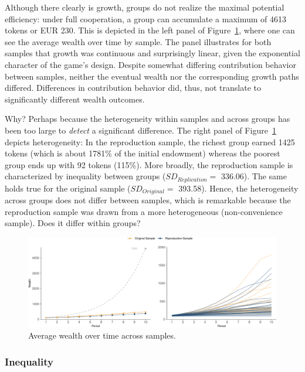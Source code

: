 \documentclass[
  authoryear,
  review,
  3p,
  onecolumn]{elsarticle}
\begin{document}
Although there clearly is growth, groups do not realize the maximal
potential efficiency: under full cooperation, a group can accumulate a
maximum of 4613 tokens or EUR 230. This is depicted in the left panel of
Figure~\ref{fig-growth-heterogeneity}, where one can see the average
wealth over time by sample. The panel illustrates for both samples that
growth was continuous and surprisingly linear, given the exponential
character of the game's design. Despite somewhat differing contribution
behavior between samples, neither the eventual wealth nor the
corresponding growth paths differed. Differences in contribution
behavior did, thus, not translate to significantly different wealth
outcomes.

Why? Perhaps because the heterogeneity within samples and across groups
has been too large to \emph{detect} a significant difference. The right
panel of Figure~\ref{fig-growth-heterogeneity} depicts heterogeneity: In
the reproduction sample, the richest group earned 1425 tokens (which is
about 1781\% of the initial endowment) whereas the poorest group ends up
with 92 tokens (115\%). More broadly, the reproduction sample is
characterized by inequality between groups (\(SD_{Replication} =\)
336.06). The same holds true for the original sample
(\(SD_{Original} =\) 393.58). Hence, the heterogeneity across groups
does not differ between samples, which is remarkable because the
reproduction sample was drawn from a more heterogeneous (non-convenience
sample). Does it differ within groups?

\begin{figure}

{\centering \includegraphics{paper_files/figure-pdf/fig-growth-heterogeneity-1.pdf}

}

\caption{\label{fig-growth-heterogeneity}Average wealth over time across
samples.}

\end{figure}

\hypertarget{sec-inequality}{%
\subsubsection{Inequality}\label{sec-inequality}}
\end{document}
